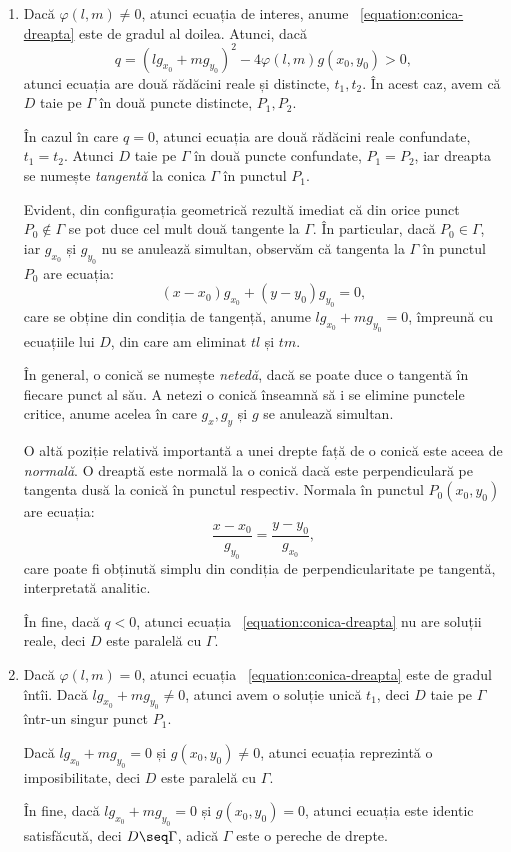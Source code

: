 \begin{enumerate}[(1)]
	\item Dacă $\varphi(l, m) \neq 0$, atunci ecuația de interes, anume
~\eqref{equation:conica-dreapta} este de gradul al doilea. Atunci, dacă\[
	q = (l g_{x_0} + mg_{y_0})^2 - 4 \varphi(l, m)g(x_0, y_0) > 0,
\]
atunci ecuația are două rădăcini reale și distincte, $t_1, t_2$. În acest caz,
avem că $D$ taie pe $\Gamma$ în două puncte distincte, $P_1, P_2$.

În cazul în care $q = 0$, atunci ecuația are două rădăcini reale confundate,
$t_1 = t_2$. Atunci $D$ taie pe $\Gamma$ în două puncte confundate, $P_1 = P_2$,
iar dreapta se numește \emph{tangentă} la conica $\Gamma$ în punctul $P_1$.

Evident, din configurația geometrică rezultă imediat că din orice punct 
$P_0 \notin \Gamma$ se pot duce cel mult două tangente la $\Gamma$. În 
particular, dacă $P_0 \in \Gamma$, iar $g_{x_0}$ și $g_{y_0}$ nu se anulează
simultan, observăm că tangenta la $\Gamma$ în punctul $P_0$ are ecuația: 
 \[
	(x - x_0) g_{x_0} + (y - y_0) g_{y_0} = 0,
\]
care se obține din condiția de tangență, anume $l g_{x_0} + mg_{y_0} = 0$,
împreună cu ecuațiile lui $D$, din care am eliminat $tl$ și $tm$.

În general, o conică se numește \emph{netedă}, dacă se poate duce o tangentă
în fiecare punct al său. A netezi o conică înseamnă să i se elimine punctele
critice, anume acelea în care $g_x, g_y$ și $g$ se anulează simultan.

O altă poziție relativă importantă a unei drepte față de o conică este aceea de
\emph{normală}. O dreaptă este normală la o conică dacă este perpendiculară pe
tangenta dusă la conică în punctul respectiv. Normala în punctul $P_0(x_0, y_0)$
are ecuația: 
 \[
	\dfrac{x - x_0}{g_{y_0}} = \dfrac{y - y_0}{g_{x_0}},
\]
care poate fi obținută simplu din condiția de perpendicularitate pe tangentă,
interpretată analitic.

În fine, dacă $q < 0$, atunci ecuația ~\eqref{equation:conica-dreapta} nu are
soluții reale, deci $D$ este paralelă cu $\Gamma$.

\item Dacă $\varphi(l, m) = 0$, atunci ecuația ~\eqref{equation:conica-dreapta}
este de gradul întîi. Dacă $lg_{x_0} + mg_{y_0} \neq 0$, atunci avem o soluție
unică $t_1$, deci $D$ taie pe $\Gamma$ într-un singur punct $P_1$.

Dacă $lg_{x_0} + mg_{y_0} = 0$ și $g(x_0, y_0) \neq 0$, atunci ecuația
reprezintă o imposibilitate, deci $D$ este paralelă cu $\Gamma$.

În fine, dacă $lg_{x_0} + mg_{y_0} = 0$ și $g(x_0, y_0) = 0$, atunci ecuația
este identic satisfăcută, deci $D \seq \Gamma$, adică $\Gamma$ este o pereche
de drepte.
\end{enumerate}

